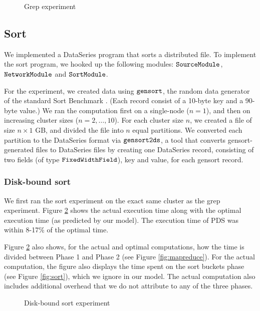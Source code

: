 \documentclass{acm_proc_article-sp}
\begin{document}
\begin{figure}
\caption{Grep experiment}
\label{fig:grepexperiment}
\end{figure}

\subsection{Sort}

We implemented a DataSeries program that sorts a distributed file. To implement the sort program, we hooked up the following
modules: $\tt SourceModule$, $\tt NetworkModule$ and $\tt
SortModule$.

For the experiment, we created data using $\tt gensort$, the random
data generator of the standard Sort Benchmark \cite{sortbenchmark}. (Each record
consist of a 10-byte key and a 90-byte value.) We ran the computation first on
a single-node ($n = 1$), and then on increasing cluster sizes ($n = 2, \ldots,
10$). For each cluster size $n$, we created a file of size $n \times 1$ GB,
and divided the file into $n$ equal partitions. We converted each partition to
the DataSeries format via $\tt gensort2ds$, a tool that converts
gensort-generated files to DataSeries files by creating one DataSeries record,
consisting of two fields (of type $\tt FixedWidthField$), key and value, for
each gensort record.

\subsubsection{Disk-bound sort}

We first ran the sort experiment on the exact same cluster as the grep
experiment. Figure \ref{fig:sort1000experiment} shows the actual execution time along with the optimal
execution time (as predicted by our model). The execution time of PDS was
within 8-17\% of the optimal time.

Figure \ref{fig:sort1000experiment} also shows, for the actual and optimal
computations, how the time is divided between Phase 1 and Phase 2 (see Figure \ref{fig:mapreduce}). For the actual computation, the
figure also displays the time spent on the sort buckets phase (see
Figure \ref{fig:sort}), which we ignore in our model. The actual computation
also includes additional overhead that we do not attribute to
any of the three phases.

\begin{figure}
\caption{Disk-bound sort experiment}
\label{fig:sort1000experiment}
\end{figure}
\end{document}
